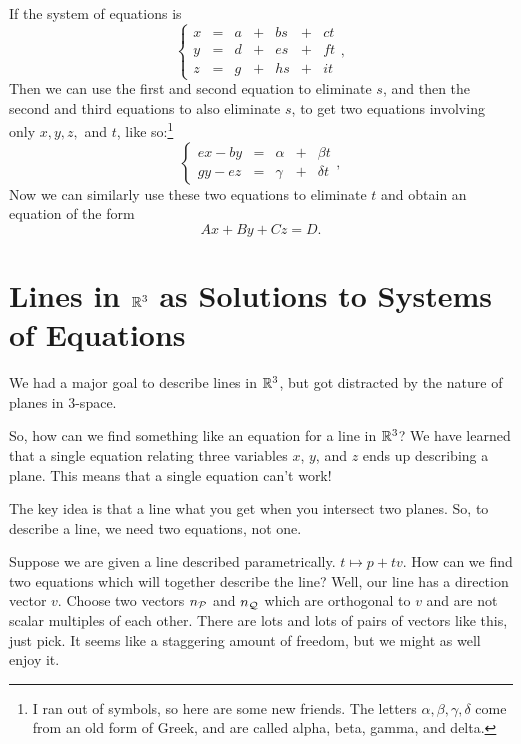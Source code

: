 \documentclass[00-livre-main.tex]{subfiles}
\begin{document}
If the system of equations is
\[
\left\{ \begin{array}{rrrrrrr}
x  &=& a &+& b s &+& c t \\
y  &=& d &+& e s &+& f t \\
z  &=& g &+& h s &+& i t 
\end{array}\right. ,
\]
Then we can use the first and second equation to eliminate $s$, and then the second and third equations to also eliminate $s$, to get two equations involving only $x,y,z,$ and $t$, like so:\footnote{I ran out of symbols, so here are some new friends. The letters $\alpha, \beta, \gamma, \delta$ come from an old form of Greek, and are called alpha, beta, gamma, and delta.}
\[
\left\{ \begin{array}{rrrrr}
ex-by &=& \alpha &+& \beta t \\
gy-ez &=& \gamma &+& \delta t
\end{array}\right. ,
\]
Now we can similarly use these two equations to eliminate $t$ and obtain an equation of the form
\[
Ax+By+Cz = D.
\]


\section*{Lines in $\mathbb{R}^3$ as Solutions to Systems of Equations}

We had a major goal to describe lines in $\mathbb{R}^3$, but got distracted by the nature of planes in $3$-space.

So, how can we find something like an equation for a line in $\mathbb{R}^3$? We have learned that a single equation relating three variables $x$, $y$, and $z$ ends up describing a plane. This means that a single equation can't work!

The key idea is that a line what you get when you intersect two planes. So, to describe a line, we need two equations, not one.

Suppose we are given a line described parametrically. $t \mapsto p + tv$.
How can we find two equations which will together describe the line? Well, our line has a direction vector $v$. Choose two vectors $n_{\mathcal{P}}$ and $n_{\mathcal{Q}}$ which are orthogonal to $v$ and are not scalar multiples of each other. There are lots and lots of pairs of vectors like this, just pick. It seems like a staggering amount of freedom, but we might as well enjoy it.
\end{document}
